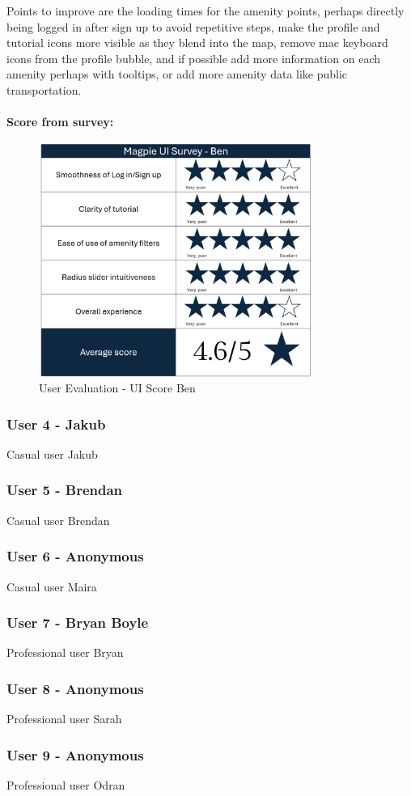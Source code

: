 Points to improve are the loading times for the amenity points, perhaps  directly being logged in after sign up to avoid repetitive steps, make the profile and tutorial icons more visible as they blend into the map, remove mac keyboard icons from the profile bubble, and if possible add more information on each amenity perhaps with tooltips, or add more amenity data like public transportation.\\\\
\textbf{Score from survey: }
\begin{figure}
    \centering
    \includegraphics[width=0.8\textwidth]{images/survey-ben.png}
    \caption{User Evaluation - UI Score Ben}
\end{figure}

\newpage
\subsubsection{User 4 - Jakub}
Casual user Jakub

\newpage
\subsubsection{User 5 - Brendan}
Casual user Brendan

\newpage
\subsubsection{User 6 - Anonymous}
Casual user Maira

\newpage
\subsubsection{User 7 - Bryan Boyle}
Professional user Bryan

\newpage
\subsubsection{User 8 - Anonymous}
Professional user Sarah

\newpage
\subsubsection{User 9 - Anonymous}
Professional user Odran
